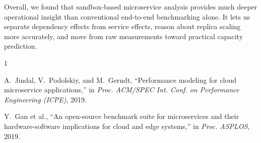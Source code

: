 \documentclass[conference]{IEEEtran}
\begin{document}
Overall, we found that sandbox-based microservice analysis provides much deeper operational insight than conventional end-to-end benchmarking alone. It lets us separate dependency effects from service effects, reason about replica scaling more accurately, and move from raw measurements toward practical capacity prediction.

\begin{thebibliography}{1}

A.~Jindal, V.~Podolskiy, and M.~Gerndt, ``Performance modeling for cloud microservice applications,'' in \emph{Proc. ACM/SPEC Int. Conf. on Performance Engineering (ICPE)}, 2019.

Y.~Gan et al., ``An open-source benchmark suite for microservices and their hardware-software implications for cloud and edge systems,'' in \emph{Proc. ASPLOS}, 2019.

\end{thebibliography}
\end{document}
